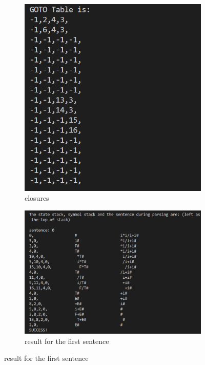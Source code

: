 \documentclass{zpt}
\begin{document}
\begin{figure}
\begin{subfigure}[t]{0.45\textwidth}
            \includegraphics[width=\textwidth]{../resources/goto.png}
            \caption{closures}
            \label{fig::goto}
        \end{subfigure}
        \begin{subfigure}[t]{0.45\textwidth}
            \includegraphics[width=\textwidth]{../resources/output1.png}
            \caption{result for the first sentence}
            \label{fig::output1}
        \end{subfigure}

\end{figure}
\end{document}
